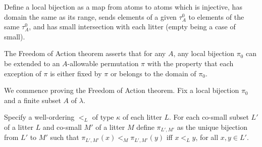 \documentclass{slides}
\begin{document}
\begin{slide}

Define a local bijection as a map from atoms to atoms which is injective, has domain the same as its range,  sends elements of a given $\tau^0_A$ to elements of the same
$\tau^0_A$, and has small intersection with each litter (empty being a case of small).



The Freedom of Action theorem asserts that for any $A$, any local bijection $\pi_0$ can be extended to an $A$-allowable permutation $\pi$ with the property that each exception of $\pi$ is either
fixed by $\pi$ or belongs to the domain of $\pi_0$.


\end{slide}

\begin{slide}

We commence proving the Freedom of Action theorem.  Fix a local bijection $\pi_0$ and a finite subset $A$ of $\lambda$. 

Specify a well-ordering $<_L$ of type $\kappa$ of each litter $L$.  For each co-small subset $L'$ of a litter $L$ and co-small $M'$ of a litter $M$ define $\pi_{L',M'}$ as
the unique bijection from $L'$ to $M'$ such that $\pi_{L',M'}(x) <_M \pi_{L',M'}(y)$ iff $x <_L y$, for all $x,y \in L'$.  

\end{slide}
\end{document}
